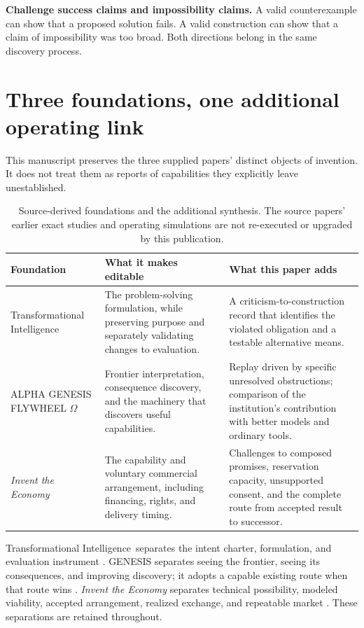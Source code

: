 \documentclass[11pt,a4paper]{article}
\newcommand{\genesis}{ALPHA GENESIS FLYWHEEL $\Omega$}
\newcommand{\ti}{Transformational Intelligence}
\begin{document}
\begin{insight}
\textbf{Challenge success claims and impossibility claims.} A valid counterexample can show that a proposed solution fails. A valid construction can show that a claim of impossibility was too broad. Both directions belong in the same discovery process.
\end{insight}

\section{Three foundations, one additional operating link}
This manuscript preserves the three supplied papers' distinct objects of invention. It does not treat them as reports of capabilities they explicitly leave unestablished.

\begin{table}[H]\small
\begin{tabularx}{\textwidth}{@{}L{37mm}YY@{}}\toprule
\textbf{Foundation} & \textbf{What it makes editable} & \textbf{What this paper adds}\\\midrule
\ti\ \cite{ti} & The problem-solving formulation, while preserving purpose and separately validating changes to evaluation. & A criticism-to-construction record that identifies the violated obligation and a testable alternative means.\\
\genesis\ \cite{genesis} & Frontier interpretation, consequence discovery, and the machinery that discovers useful capabilities. & Replay driven by specific unresolved obstructions; comparison of the institution's contribution with better models and ordinary tools.\\
\emph{Invent the Economy}\ \cite{economy} & The capability and voluntary commercial arrangement, including financing, rights, and delivery timing. & Challenges to composed promises, reservation capacity, unsupported consent, and the complete route from accepted result to successor.\\\bottomrule
\end{tabularx}
\caption{Source-derived foundations and the additional synthesis. The source papers' earlier exact studies and operating simulations are not re-executed or upgraded by this publication.}
\end{table}

\ti\ separates the intent charter, formulation, and evaluation instrument \cite[Secs.~2, 7]{ti}. GENESIS separates seeing the frontier, seeing its consequences, and improving discovery; it adopts a capable existing route when that route wins \cite[Secs.~3, 12]{genesis}. \emph{Invent the Economy} separates technical possibility, modeled viability, accepted arrangement, realized exchange, and repeatable market \cite[Sec.~2.2]{economy}. These separations are retained throughout.
\end{document}

